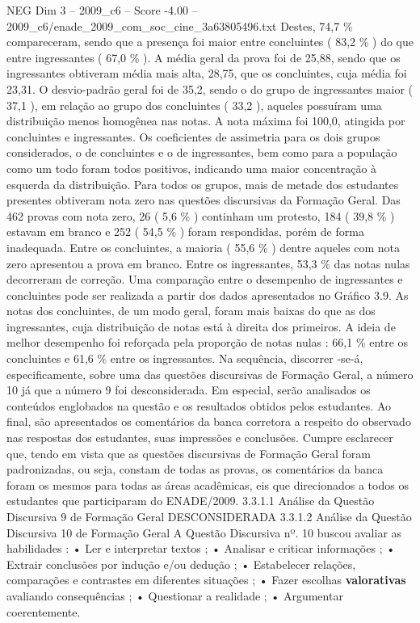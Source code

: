 \begin{textsample}{NEG Dim 3 – 2009\_c6 – Score -4.00 – 2009\_c6/enade\_2009\_com\_soc\_cine\_3a63805496.txt}
Destes, 74,7 \% compareceram, sendo que a presença foi maior entre concluintes ( 83,2 \% ) do que entre ingressantes ( 67,0 \% ).
A média geral da prova foi de 25,88, sendo que os ingressantes obtiveram média mais alta, 28,75, que os concluintes, cuja média foi 23,31.
O desvio-padrão geral foi de 35,2, sendo o do grupo de ingressantes maior ( 37,1 ), em relação ao grupo dos concluintes ( 33,2 ), aqueles possuíram uma distribuição menos homogênea nas notas.
A nota máxima foi 100,0, atingida por concluintes e ingressantes.
Os coeficientes de assimetria para os dois grupos considerados, o de concluintes e o de ingressantes, bem como para a população como um todo foram todos positivos, indicando uma maior concentração à esquerda da distribuição.
Para todos os grupos, mais de metade dos estudantes presentes obtiveram nota zero nas questões discursivas da Formação Geral.
Das 462 provas com nota zero, 26 ( 5,6 \% ) continham um protesto, 184 ( 39,8 \% ) estavam em branco e 252 ( 54,5 \% ) foram respondidas, porém de forma inadequada.
Entre os concluintes, a maioria ( 55,6 \% ) dentre aqueles com nota zero apresentou a prova em branco.
Entre os ingressantes, 53,3 \% das notas nulas decorreram de correção.
Uma comparação entre o desempenho de ingressantes e concluintes pode ser realizada a partir dos dados apresentados no Gráfico 3.9.
As notas dos concluintes, de um modo geral, foram mais baixas do que as dos ingressantes, cuja distribuição de notas está à direita dos primeiros.
A ideia de melhor desempenho foi reforçada pela proporção de notas nulas : 66,1 \% entre os concluintes e 61,6 \% entre os ingressantes.
Na sequência, discorrer -se-á, especificamente, sobre uma das questões discursivas de Formação Geral, a número 10 já que a número 9 foi desconsiderada.
Em especial, serão analisados os conteúdos englobados na questão e os resultados obtidos pelos estudantes.
Ao final, são apresentados os comentários da banca corretora a respeito do observado nas respostas dos estudantes, suas impressões e conclusões.
Cumpre esclarecer que, tendo em vista que as questões discursivas de Formação Geral foram padronizadas, ou seja, constam de todas as provas, os comentários da banca foram os mesmos para todas as áreas acadêmicas, eis que direcionados a todos os estudantes que participaram do ENADE/2009. 3.3.1.1 Análise da Questão Discursiva 9 de Formação Geral DESCONSIDERADA 3.3.1.2 Análise da Questão Discursiva 10 de Formação Geral A Questão Discursiva nº. 10 buscou avaliar as habilidades : • Ler e interpretar textos ; • Analisar e criticar informações ; • Extrair conclusões por indução e/ou dedução ; • Estabelecer relações, comparações e contrastes em diferentes situações ; • Fazer escolhas \textbf{valorativas} avaliando consequências ; • Questionar a realidade ; • Argumentar coerentemente.

\end{textsample}
